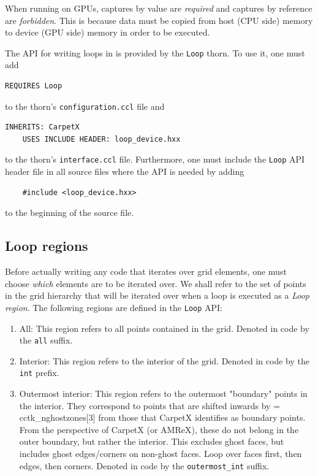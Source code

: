 When running on GPUs, captures by value are \textit{required} and captures by reference are \textit{forbidden}. This is because data must be copied from host (CPU side) memory to device (GPU side) memory in order to be executed.

The API for writing loops in \CarpetX\space is provided by the \texttt{Loop} thorn. To use it, one must add
%
\begin{lstlisting}[language=Bash]
    REQUIRES Loop
\end{lstlisting}
%
to the thorn's \texttt{configuration.ccl} file and
%
\begin{lstlisting}[language=Bash]
    INHERITS: CarpetX   
    USES INCLUDE HEADER: loop_device.hxx
\end{lstlisting}
%
to the thorn's \texttt{interface.ccl} file. Furthermore, one must include the \texttt{Loop} API header file in all source files where the API is needed by adding
%
\begin{lstlisting}
    #include <loop_device.hxx>
\end{lstlisting}
%
to the beginning of the source file.

\subsection{Loop regions}
\label{sec:loop_regions}

Before actually writing any code that iterates over grid elements, one must choose \textit{which} elements are to be iterated over. We shall refer to the set of points in the grid hierarchy that will be iterated over when a loop is executed as a \textit{Loop region}. The following regions are defined in the \texttt{Loop} API:

\begin{enumerate}
    \item All: This region refers to all points contained in the grid. Denoted in code by the \texttt{all} suffix.
    
    \item Interior: This region refers to the interior of the grid. Denoted in code by the \texttt{int} prefix.
    
    \item Outermost interior: This region refers to the outermost "boundary" points in the interior. They correspond to points that are shifted inwards by = cctk\_nghostzones[3] from those that CarpetX identifies as boundary points. From the perspective of CarpetX (or AMReX), these do not belong in the outer boundary, but rather the interior. This excludes ghost faces, but includes ghost edges/corners on non-ghost faces. Loop over faces first, then edges, then corners. Denoted in code by the \texttt{outermost\_int} suffix.
\end{enumerate}


